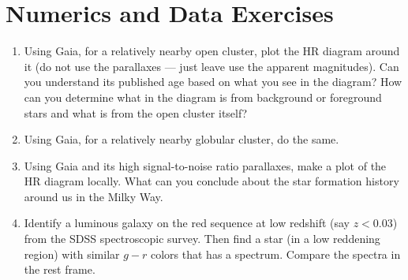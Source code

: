 \section{Numerics and Data Exercises}

\begin{enumerate}
\item Using Gaia, for a relatively nearby open cluster,
plot the HR diagram around it (do not use the parallaxes --- just
leave use the apparent magnitudes). Can you understand its published
age based on what you see in the diagram? How can you determine what
in the diagram is from background or foreground stars and what is from
the open cluster itself?
\item Using Gaia, for a relatively nearby globular cluster, do the
same.
\item Using Gaia and its high signal-to-noise ratio parallaxes,
make a plot of the HR diagram locally. What can you conclude about the
star formation history around us in the Milky Way.
\item Identify a luminous galaxy on the red sequence at low redshift
(say $z<0.03$) from the SDSS spectroscopic survey. Then find a star
(in a low reddening region) with similar $g-r$ colors that has a
spectrum. Compare the spectra in the rest frame.
\end{enumerate}


  
